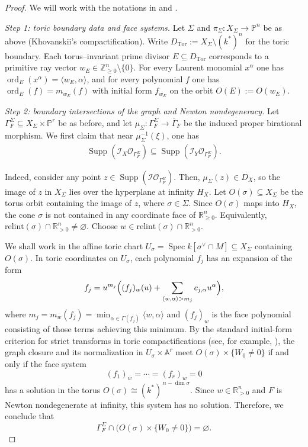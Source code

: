 \documentclass[12pt]{amsart}
\newcommand{\kk}{k}
\newcommand{\ZZ}{\mathbb{Z}}
\newcommand{\RR}{\mathbb{R}}
\newcommand{\PP}{\mathbb{P}}
\renewcommand{\AA}{\mathbb{A}}
\newcommand{\Supp}{\operatorname{\mathrm{Supp}}}
\newcommand{\ord}{\operatorname{\mathrm{ord}}}
\newcommand{\cO}{\mathcal{O}}
\DeclareMathOperator{\Spec}{Spec}
\DeclareMathOperator{\tor}{Tor}
\theoremstyle{plain}
\theoremstyle{definition}
\numberwithin{equation}{section}
\begin{document}
\begin{proof}
	We will work with the notations in  and .
	
	\smallskip
	\noindent\emph{Step 1: toric boundary data and face systems.}
	Let $\Sigma$ and $\pi_\Sigma:X_\Sigma\to \PP^n$ be as above (Khovanskii's compactification).
	Write $D_{\tor}:=X_\Sigma\setminus(\kk^*)^n$ for the toric boundary.
	Each torus--invariant prime divisor $E\subseteq D_{\tor}$ corresponds to a primitive
	ray vector $w_E\in \ZZ_{\ge 0}^n\setminus\{0\}$.
	For every Laurent monomial $x^\alpha$ one has $\ord_E(x^\alpha)=\langle w_E,\alpha\rangle$,
	and for every polynomial $f$ one has $\ord_E(f)=m_{w_E}(f)$ with initial form $f_{w_E}$
	on the orbit $O(E) := O(w_E)$.
	
	
	\smallskip
	\noindent\emph{Step 2: boundary intersections of the graph and Newton nondegeneracy.}
	Let $\Gamma_F^\Sigma\subseteq X_\Sigma\times \PP^r$ be as before, and let
	$\mu_\Sigma:\Gamma_F^\Sigma\to \overline{\Gamma}_F$ be the induced proper birational morphism.
	We first claim that near $\mu_\Sigma^{-1}(\xi)$, one has
    \begin{align}
    \Supp (\mathscr{I}_X \cO_{\Gamma_F^\Sigma}) \subseteq \Supp (\mathscr{I}_Y \cO_{\Gamma_F^\Sigma}). \label{eq.supportGamma}
    \end{align}
    
    Indeed, consider any point $z \in \Supp(\mathscr{I}\cO_{\Gamma_F^\Sigma})$. Then, $\mu_\Sigma(z) \in D_X$, so the image of $z$ in $X_\Sigma$ lies over the hyperplane at infinity $H_X$. Let $O(\sigma) \subseteq X_\Sigma$ be the torus orbit containing the image of $z$, where $\sigma \in \Sigma$. Since $O(\sigma)$ maps into $H_X$, the cone $\sigma$ is not contained in any coordinate face
	of $\RR_{\ge0}^n$. Equivalently, $\text{relint}(\sigma)\cap \RR_{>0}^n\neq \varnothing.$ Choose $w\in \text{relint}(\sigma)\cap \RR_{>0}^n.$

We shall work in the affine toric chart $U_\sigma=\Spec k[\sigma^\vee\cap M]\subseteq X_\Sigma$ containing $O(\sigma)$. In toric coordinates on $U_\sigma$, each polynomial $f_j$ has an
	expansion of the form
	\[
	f_j=u^{m_j}\Bigl((f_j)_w(u)+\sum_{\langle w,\alpha\rangle>m_j} c_{j,\alpha}u^\alpha\Bigr),
	\]
where $m_j = m_w(f_j) = \min_{\alpha \in \Gamma(f_j)}\langle w,\alpha\rangle$ and $(f_j)_w$ is the face polynomial consisting of those terms achieving this minimum.
	By the standard initial-form criterion for strict transforms in toric compactifications
	(see, for example, \cite{Khovanskii,Oka}), the graph closure and its normalization in $U_\sigma \times \AA^r$ meet $O(\sigma)\times \{W_0\neq 0\}$ if and only if the face system
	\[
	(f_1)_w=\cdots=(f_r)_w=0
	\]
	has a solution in the torus $O(\sigma)\cong (k^*)^{\,n-\dim\sigma}.$
	Since $w\in \RR_{>0}^n$ and $F$ is Newton nondegenerate at infinity, this system has no
	solution. Therefore, we conclude that
	\[
	\Gamma_F^\Sigma\cap \bigl(O(\sigma)\times\{W_0\neq 0\}\bigr)=\varnothing.
	\]
	

\end{proof}
\end{document}
